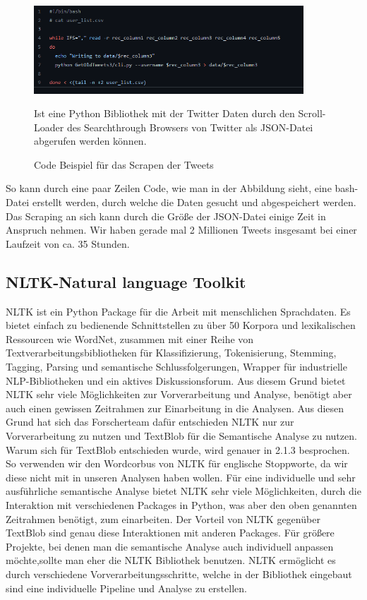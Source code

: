 	
	\begin{figure}[ht]
		\centering
		\includegraphics[width=0.9\textwidth]{images/Kapitel2/Code_Beispiel_1}
			\caption{\label{fig:CodeBeispiel}Code Beispiel für das Scrapen der Tweets}{Ist eine Python Bibliothek mit der Twitter Daten durch den Scroll-Loader 
			        des Searchthrough Browsers von Twitter als JSON-Datei abgerufen werden können.}
	\end{figure}
	
	So kann durch eine paar Zeilen Code, wie man in der Abbildung \label{CodeBeispiel} sieht, eine bash-Datei erstellt werden, durch welche die Daten gesucht 
	und abgespeichert werden. Das Scraping an sich kann durch die Größe der JSON-Datei einige Zeit in Anspruch nehmen. Wir haben gerade mal 2 Millionen Tweets 
	insgesamt bei einer Laufzeit von ca. 35 Stunden.  
	

	\subsection{NLTK-Natural language Toolkit}
	
	NLTK ist ein Python Package für die Arbeit mit menschlichen Sprachdaten. Es bietet einfach zu bedienende Schnittstellen zu über 50 Korpora
	und lexikalischen Ressourcen wie WordNet, zusammen mit einer Reihe von Textverarbeitungsbibliotheken für Klassifizierung, Tokenisierung, 
	Stemming, Tagging, Parsing und semantische Schlussfolgerungen, Wrapper für industrielle NLP-Bibliotheken und ein aktives Diskussionsforum.  
	Aus diesem Grund bietet NLTK sehr viele Möglichkeiten zur Vorverarbeitung und Analyse, benötigt aber auch einen gewissen Zeitrahmen zur 
	Einarbeitung in die Analysen. Aus diesen Grund hat sich das Forscherteam dafür entschieden NLTK nur zur Vorverarbeitung zu nutzen und TextBlob
	für die Semantische Analyse zu nutzen. Warum sich für TextBlob entschieden wurde, wird genauer in 2.1.3 besprochen. So verwenden wir den Wordcorbus
	von NLTK für englische Stoppworte, da wir diese nicht mit in unseren Analysen haben wollen. Für eine individuelle und sehr ausführliche semantische Analyse 
	bietet NLTK sehr viele Möglichkeiten, durch die Interaktion mit verschiedenen Packages in Python, was aber den oben genannten Zeitrahmen benötigt, zum 
	einarbeiten. Der Vorteil von NLTK gegenüber TextBlob sind genau diese Interaktionen mit anderen Packages. Für größere Projekte, bei denen man die 
	semantische Analyse auch individuell anpassen möchte,sollte man eher die NLTK Bibliothek benutzen. NLTK ermöglicht es durch verschiedene 
	Vorverarbeitungsschritte, welche in der Bibliothek eingebaut sind eine individuelle Pipeline und Analyse zu erstellen.
	
